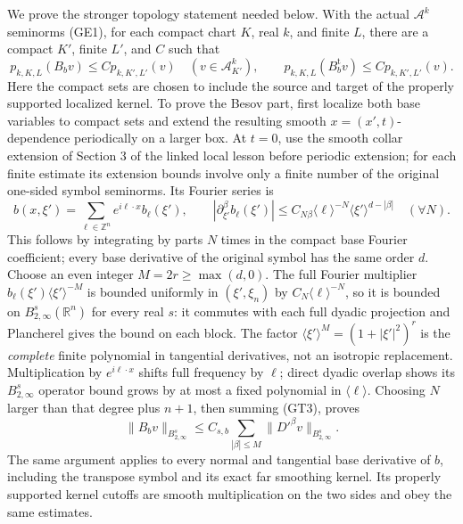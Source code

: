 \documentclass[
  11pt,
]{article}
\begin{document}
We prove the stronger topology statement needed below. With the actual
\(\mathcal A^k\) seminorms (GE1), for each compact chart \(K\), real
\(k\), and finite \(L\), there are a compact \(K'\), finite \(L'\), and
\(C\) such that \[
 p_{k,K,L}(B_bv)\le C p_{k,K',L'}(v)
 \quad(v\in\mathcal A^k_{K'}),
 \qquad
 p_{k,K,L}(B_b^{\mathrm t}v)\le C p_{k,K',L'}(v).
 \tag{GT2}
\] Here the compact sets are chosen to include the source and target of
the properly supported localized kernel. To prove the Besov part, first
localize both base variables to compact sets and extend the resulting
smooth \(x=(x',t)\)-dependence periodically on a larger box. At \(t=0\),
use the smooth collar extension of Section 3 of the linked local lesson
before periodic extension; for each finite estimate its extension bounds
involve only a finite number of the original one-sided symbol seminorms.
Its Fourier series is \[
 b(x,\xi')=\sum_{\ell\in\mathbb Z^n}
       e^{i\ell\cdot x}b_\ell(\xi'),\qquad
 |\partial_{\xi'}^\beta b_\ell(\xi')|
   \le C_{N\beta}\langle\ell\rangle^{-N}
                         \langle\xi'\rangle^{d-|\beta|}
 \quad(\forall N).
 \tag{GT3}
\] This follows by integrating by parts \(N\) times in the compact base
Fourier coefficient; every base derivative of the original symbol has
the same order \(d\). Choose an even integer \(M=2r\ge\max(d,0)\). The
full Fourier multiplier \(b_\ell(\xi')\langle\xi'\rangle^{-M}\) is
bounded uniformly in \((\xi',\xi_n)\) by \(C_N\langle\ell\rangle^{-N}\),
so it is bounded on \(B^s_{2,\infty}(\mathbb R^n)\) for every real
\(s\): it commutes with each full dyadic projection and Plancherel gives
the bound on each block. The factor
\(\langle\xi'\rangle^M=(1+|\xi'|^2)^r\) is the \emph{complete} finite
polynomial in tangential derivatives, not an isotropic replacement.
Multiplication by \(e^{i\ell\cdot x}\) shifts full frequency by
\(\ell\); direct dyadic overlap shows its \(B^s_{2,\infty}\) operator
bound grows by at most a fixed polynomial in \(\langle\ell\rangle\).
Choosing \(N\) larger than that degree plus \(n+1\), then summing (GT3),
proves \[
 \|B_bv\|_{B^s_{2,\infty}}
 \le C_{s,b}\sum_{|\beta|\le M}
          \|D'^\beta v\|_{B^s_{2,\infty}}.
 \tag{GT4}
\] The same argument applies to every normal and tangential base
derivative of \(b\), including the transpose symbol and its exact far
smoothing kernel. Its properly supported kernel cutoffs are smooth
multiplication on the two sides and obey the same estimates.
\end{document}
